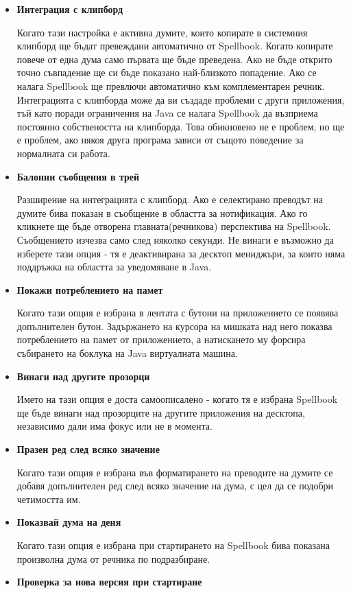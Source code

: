 \begin{itemize}
  \item \textbf{Интеграция с клипборд}
    
    Когато тази настройка е активна думите, които копирате в системния
    клипборд ще бъдат превеждани автоматично от Spellbook. Когато
    копирате повече от една дума само първата ще бъде преведена. Ако
    не бъде открито точно съвпадение ще си бъде показано най-близкото
    попадение. Ако се налага Spellbook ще превлючи автоматично към
    комплементарен речник. Интеграцията с клипборда може да ви създаде
    проблеми с други приложения, тъй като поради ограничения на Java
    се налага Spellbook да възприема постоянно собствеността на
    клипборда. Това обикновено не е проблем, но ще е проблем, ако
    някоя друга програма зависи от същото поведение за нормалната си
    работа. 
  \item \textbf{Балонни съобщения в трей} 

    Разширение на интеграцията с клипборд. Ако е селектирано преводът
    на думите бива показан в съобщение в областта за нотификация. Ако
    го кликнете ще бъде отворена главната(речникова) перспектива на
    Spellbook. Съобщението изчезва само след няколко секунди. Не
    винаги е възможно да изберете тази опция - тя е деактивирана за
    десктоп мениджъри, за които няма поддръжка на областта за
    уведомяване в Java.
  \item \textbf{Покажи потреблението на памет}

    Когато тази опция е избрана в лентата с бутони на приложението се
    появява допълнителен бутон. Задържането на курсора на мишката над
    него показва потреблението на памет от приложението, а натискането
    му форсира събирането на боклука на Java виртуалната машина. 
  \item \textbf{Винаги над другите прозорци}

    Името на тази опция е доста самоописалено - когато тя е избрана
    Spellbook ще бъде винаги над прозорците на другите приложения на
    десктопа, независимо дали има фокус или не в момента.
  \item \textbf{Празен ред след всяко значение}

    Когато тази опция е избрана във форматирането на преводите на
    думите се добавя допълнителен ред след всяко значение на дума, с
    цел да се подобри четимостта им.
  \item \textbf{Показвай дума на деня}

    Когато тази опция е избрана при стартирането на Spellbook бива
    показана произволна дума от речника по подразбиране.
  \item \textbf{Проверка за нова версия при стартиране}


\end{itemize}
